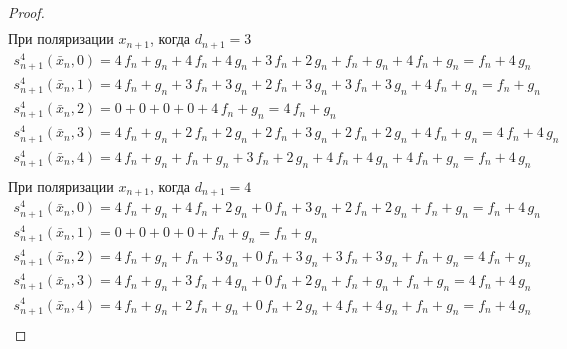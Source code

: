 \documentclass[a4paper, 12pt]{extarticle}
\begin{document}
\begin{proof}
$$\begin{array}{l}
\end{array}$$
При поляризации $x_{n+1}$, когда $d_{n+1} = 3$
$$\begin{array}{l}
s_{n+1}^4(\bar{x}_n, 0) = 4\,f_n + g_n + 4\,f_n + 4\,g_n + 3\,f_n + 2\,g_n + f_n + g_n + 4\,f_n + g_n = f_n + 4\,g_n \\
s_{n+1}^4(\bar{x}_n, 1) = 4\,f_n + g_n + 3\,f_n + 3\,g_n + 2\,f_n + 3\,g_n + 3\,f_n + 3\,g_n + 4\,f_n + g_n = f_n + g_n \\
s_{n+1}^4(\bar{x}_n, 2) = 0 + 0 + 0 + 0 + 4\,f_n + g_n = 4\,f_n + g_n \\
s_{n+1}^4(\bar{x}_n, 3) = 4\,f_n + g_n + 2\,f_n + 2\,g_n + 2\,f_n + 3\,g_n + 2\,f_n + 2\,g_n + 4\,f_n + g_n = 4\,f_n + 4\,g_n \\
s_{n+1}^4(\bar{x}_n, 4) = 4\,f_n + g_n + f_n + g_n + 3\,f_n + 2\,g_n + 4\,f_n + 4\,g_n + 4\,f_n + g_n = f_n + 4\,g_n \\
\end{array}$$
При поляризации $x_{n+1}$, когда $d_{n+1} = 4$
$$\begin{array}{l}
s_{n+1}^4(\bar{x}_n, 0) = 4\,f_n + g_n + 4\,f_n + 2\,g_n + 0\,f_n + 3\,g_n + 2\,f_n + 2\,g_n + f_n + g_n = f_n + 4\,g_n \\
s_{n+1}^4(\bar{x}_n, 1) = 0 + 0 + 0 + 0 + f_n + g_n = f_n + g_n \\
s_{n+1}^4(\bar{x}_n, 2) = 4\,f_n + g_n + f_n + 3\,g_n + 0\,f_n + 3\,g_n + 3\,f_n + 3\,g_n + f_n + g_n = 4\,f_n + g_n \\
s_{n+1}^4(\bar{x}_n, 3) = 4\,f_n + g_n + 3\,f_n + 4\,g_n + 0\,f_n + 2\,g_n + f_n + g_n + f_n + g_n = 4\,f_n + 4\,g_n \\
s_{n+1}^4(\bar{x}_n, 4) = 4\,f_n + g_n + 2\,f_n + g_n + 0\,f_n + 2\,g_n + 4\,f_n + 4\,g_n + f_n + g_n = f_n + 4\,g_n \\
\end{array}$$

\end{proof}



\makeatletter
\renewcommand*{\@biblabel}[1]{\hfill#1.}
\makeatother

\newpage
\end{document}

